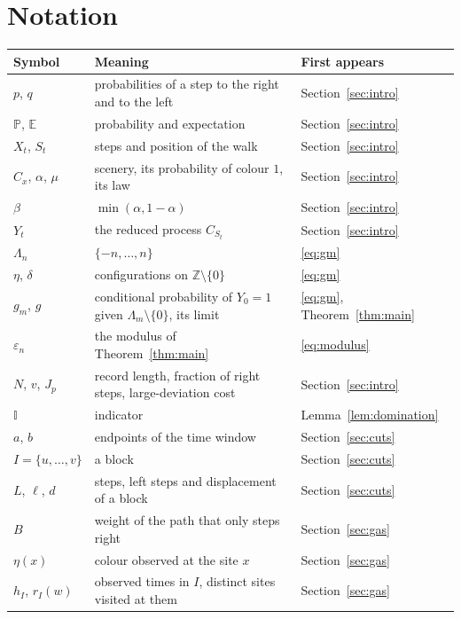 \documentclass[11pt]{amsart}
\theoremstyle{remark}
\newcommand{\Z}{\mathbb{Z}}
\newcommand{\PP}{\mathbb{P}}
\newcommand{\E}{\mathbb{E}}
\newcommand{\I}{\mathbb{I}}
\begin{document}
\appendix
\section{Notation}\label{app:notation}

\begin{center}
\begin{tabular}{p{3.0cm}p{8.0cm}p{3.1cm}}
\toprule
Symbol & Meaning & First appears\\
\midrule
$p$, $q$ & probabilities of a step to the right and to the left & Section~\ref{sec:intro}\\
$\PP$, $\E$ & probability and expectation & Section~\ref{sec:intro}\\
$X_t$, $S_t$ & steps and position of the walk & Section~\ref{sec:intro}\\
$C_x$, $\alpha$, $\mu$ & scenery, its probability of colour $1$, its law & Section~\ref{sec:intro}\\
$\beta$ & $\min(\alpha,1-\alpha)$ & Section~\ref{sec:intro}\\
$Y_t$ & the reduced process $C_{S_t}$ & Section~\ref{sec:intro}\\
$\Lambda_n$ & $\{-n,\dots,n\}$ & \eqref{eq:gm}\\
$\eta$, $\delta$ & configurations on $\Z\setminus\{0\}$ & \eqref{eq:gm}\\
$g_m$, $g$ & conditional probability of $Y_0=1$ given $\Lambda_m\setminus\{0\}$, its limit & \eqref{eq:gm},
Theorem~\ref{thm:main}\\
$\varepsilon_n$ & the modulus of Theorem~\ref{thm:main} & \eqref{eq:modulus}\\
$N$, $v$, $J_p$ & record length, fraction of right steps, large-deviation cost & Section~\ref{sec:intro}\\
$\I$ & indicator & Lemma~\ref{lem:domination}\\
$a$, $b$ & endpoints of the time window & Section~\ref{sec:cuts}\\
$I=\{u,\dots,v\}$ & a block & Section~\ref{sec:cuts}\\
$L$, $\ell$, $d$ & steps, left steps and displacement of a block & Section~\ref{sec:cuts}\\
$B$ & weight of the path that only steps right & Section~\ref{sec:gas}\\
$\eta(x)$ & colour observed at the site $x$ & Section~\ref{sec:gas}\\
$h_I$, $r_I(w)$ & observed times in $I$, distinct sites visited at them & Section~\ref{sec:gas}\\

\end{tabular}
\end{center}
\end{document}

